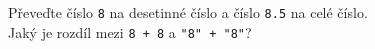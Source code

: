 \question[30]
Převeďte číslo \texttt{8} na desetinné číslo a číslo \texttt{8.5} na celé číslo.\\
Jaký je rozdíl mezi \texttt{8 + 8} a \texttt{"8" + "8"}?